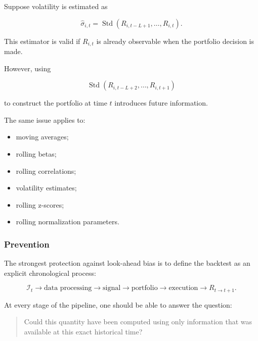 \documentclass[11pt,a4paper]{article}
\begin{document}
Suppose volatility is estimated as

\begin{equation}
\widehat{\sigma}_{i,t}
=
\operatorname{Std}
\left(
R_{i,t-L+1},
\ldots,
R_{i,t}
\right).
\end{equation}

This estimator is valid if $R_{i,t}$ is already observable when the portfolio
decision is made.

However, using

\begin{equation}
\operatorname{Std}
\left(
R_{i,t-L+2},
\ldots,
R_{i,t+1}
\right)
\end{equation}

to construct the portfolio at time $t$ introduces future information.

The same issue applies to:

\begin{itemize}
    \item moving averages;
    \item rolling betas;
    \item rolling correlations;
    \item volatility estimates;
    \item rolling z-scores;
    \item rolling normalization parameters.
\end{itemize}


\subsubsection{Prevention}

The strongest protection against look-ahead bias is to define the backtest as
an explicit chronological process:

\begin{equation}
\boxed{
\mathcal{I}_t
\rightarrow
\text{data processing}
\rightarrow
\text{signal}
\rightarrow
\text{portfolio}
\rightarrow
\text{execution}
\rightarrow
R_{t\rightarrow t+1}.
}
\end{equation}

At every stage of the pipeline, one should be able to answer the question:

\begin{quote}
Could this quantity have been computed using only information that was
available at this exact historical time?
\end{quote}


\end{document}
